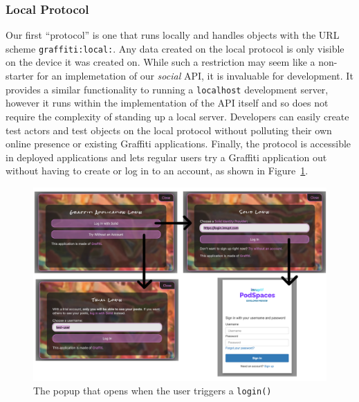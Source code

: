 



\subsubsection{Local Protocol}

Our first ``protocol'' is one that runs locally
and handles objects with the URL scheme \texttt{graffiti:local:}.
Any data created on the local protocol is only visible on the device
it was created on.
While such a restriction may seem like a non-starter for an implemetation
of our \emph{social} API, it is invaluable for development.
It provides a similar functionality to running a \texttt{localhost} development server,
however it runs within the implementation of the API itself and so
does not require the complexity of standing up a local server.
Developers can easily create test actors and test objects on the local protocol
without polluting their own online presence or existing Graffiti applications.
Finally, the protocol is accessible in deployed applications
and lets regular users try a Graffiti application out without
having to create or log in to an account, as shown in
Figure~\ref{above-and-below:login}.

\begin{figure}
    \label{above-and-below:login}
    \includegraphics{figures/login.png}
    \caption{The popup that opens when the user triggers a \texttt{login()}}
\end{figure}

